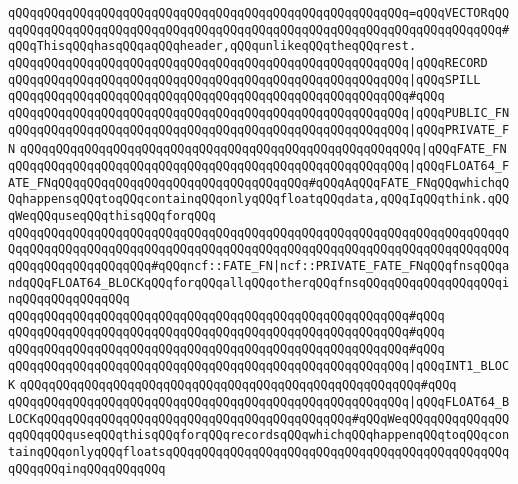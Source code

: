 \verb|qQQqqQQqqQQqqQQqqQQqqQQqqQQqqQQqqQQqqQQqqQQqqQQqqQQqqQQq=qQQqVECTORqQQqqQQqqQQqqQQqqQQqqQQqqQQqqQQqqQQqqQQqqQQqqQQqqQQqqQQqqQQqqQQqqQQqqQQq#qQQqThisqQQqhasqQQqaqQQqheader,qQQqunlikeqQQqtheqQQqrest.|\newline
\verb|qQQqqQQqqQQqqQQqqQQqqQQqqQQqqQQqqQQqqQQqqQQqqQQqqQQqqQQq|\verb#|qQQqRECORD#\newline
\verb|qQQqqQQqqQQqqQQqqQQqqQQqqQQqqQQqqQQqqQQqqQQqqQQqqQQqqQQq|\verb#|qQQqSPILL#\newline
\verb|qQQqqQQqqQQqqQQqqQQqqQQqqQQqqQQqqQQqqQQqqQQqqQQqqQQqqQQq#qQQq|\newline
\verb|qQQqqQQqqQQqqQQqqQQqqQQqqQQqqQQqqQQqqQQqqQQqqQQqqQQqqQQq|\verb#|qQQqPUBLIC_FN#\newline
\verb|qQQqqQQqqQQqqQQqqQQqqQQqqQQqqQQqqQQqqQQqqQQqqQQqqQQqqQQq|\verb#|qQQqPRIVATE_FN#\newline
\verb|qQQqqQQqqQQqqQQqqQQqqQQqqQQqqQQqqQQqqQQqqQQqqQQqqQQqqQQq|\verb#|qQQqFATE_FN#\newline
\verb|qQQqqQQqqQQqqQQqqQQqqQQqqQQqqQQqqQQqqQQqqQQqqQQqqQQqqQQq|\verb#|qQQqFLOAT64_FATE_FNqQQqqQQqqQQqqQQqqQQqqQQqqQQqqQQqqQQq#\verb|#qQQqAqQQqFATE_FNqQQqwhichqQQqhappensqQQqtoqQQqcontainqQQqonlyqQQqfloatqQQqdata,qQQqIqQQqthink.qQQqWeqQQquseqQQqthisqQQqforqQQq|\newline
\verb|qQQqqQQqqQQqqQQqqQQqqQQqqQQqqQQqqQQqqQQqqQQqqQQqqQQqqQQqqQQqqQQqqQQqqQQqqQQqqQQqqQQqqQQqqQQqqQQqqQQqqQQqqQQqqQQqqQQqqQQqqQQqqQQqqQQqqQQqqQQqqQQqqQQqqQQqqQQqqQQq#qQQqncf::FATE_FN|\verb#|ncf::PRIVATE_FATE_FNqQQqfnsqQQqandqQQqFLOAT64_BLOCKqQQqforqQQqallqQQqotherqQQqfnsqQQqqQQqqQQqqQQqqQQqinqQQqqQQqqQQq#\verb|qQQq|\newline
\verb|qQQqqQQqqQQqqQQqqQQqqQQqqQQqqQQqqQQqqQQqqQQqqQQqqQQqqQQq#qQQq|\newline
\verb|qQQqqQQqqQQqqQQqqQQqqQQqqQQqqQQqqQQqqQQqqQQqqQQqqQQqqQQq#qQQq|\newline
\verb|qQQqqQQqqQQqqQQqqQQqqQQqqQQqqQQqqQQqqQQqqQQqqQQqqQQqqQQq#qQQq|\newline
\verb|qQQqqQQqqQQqqQQqqQQqqQQqqQQqqQQqqQQqqQQqqQQqqQQqqQQqqQQq|\verb#|qQQqINT1_BLOCK#\newline
\verb|qQQqqQQqqQQqqQQqqQQqqQQqqQQqqQQqqQQqqQQqqQQqqQQqqQQqqQQq#qQQq|\newline
\verb|qQQqqQQqqQQqqQQqqQQqqQQqqQQqqQQqqQQqqQQqqQQqqQQqqQQqqQQq|\verb#|qQQqFLOAT64_BLOCKqQQqqQQqqQQqqQQqqQQqqQQqqQQqqQQqqQQqqQQqqQQq#\verb|#qQQqWeqQQqqQQqqQQqqQQqqQQqqQQquseqQQqthisqQQqforqQQqrecordsqQQqwhichqQQqhappenqQQqtoqQQqcontainqQQqonlyqQQqfloatsqQQqqQQqqQQqqQQqqQQqqQQqqQQqqQQqqQQqqQQqqQQqqQQqqQQqqQQqinqQQqqQQqqQQq|\newline
